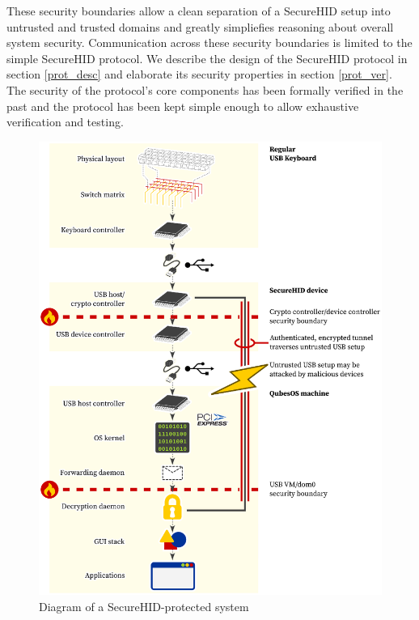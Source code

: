 \documentclass[12pt,a4paper,notitlepage]{article}
\begin{document}
These security boundaries allow a clean separation of a SecureHID setup into untrusted and trusted domains and greatly
simpliefies reasoning about overall system security.  Communication across these security boundaries is limited to the
simple SecureHID protocol. We describe the design of the SecureHID protocol in section \ref{prot_desc} and elaborate
its security properties in section \ref{prot_ver}. The security of the protocol's core components has been formally
verified in the past and the protocol has been kept simple enough to allow exhaustive verification and testing.

\begin{figure}[H]
    \includegraphics[scale=0.8]{system_diagram_with_secureusb.eps}
    \caption{Diagram of a SecureHID-protected system}
    \label{diagram_with}
\end{figure}
\end{document}
